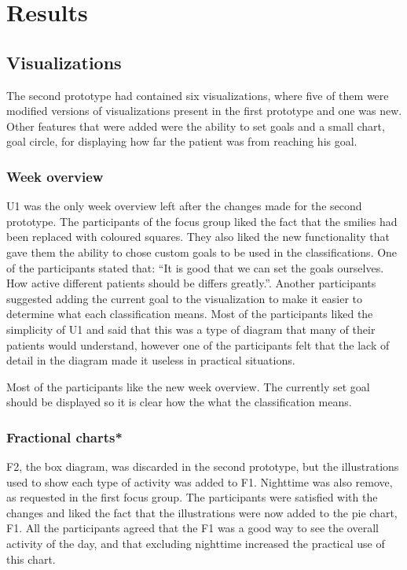 \section{Results}

\subsection{Visualizations}
The second prototype had contained six visualizations, where five of them were modified versions of visualizations present in the first prototype and one was new. Other features that were added were the ability to set goals and a small chart, goal circle, for displaying how far the patient was from reaching his goal.

\subsubsection{Week overview}
U1 was the only week overview left after the changes made for the second prototype. The participants of the focus group liked the fact that the smilies had been replaced with coloured squares. They also liked the new functionality that gave them the ability to chose custom goals to be used in the classifications. One of the participants stated that: ``It is good that we can set the goals ourselves. How active different patients should be differs greatly.''. Another participants suggested adding the current goal to the visualization to make it easier to determine what each classification means. Most of the participants liked the simplicity of U1 and said that this was a type of diagram that many of their patients would understand, however one of the participants felt that the lack of detail in the diagram made it useless in practical situations.

Most of the participants like the new week overview. The currently set goal should be displayed so it is clear how the what the classification means.

\subsubsection{Fractional charts*}
F2, the box diagram, was discarded in the second prototype, but the illustrations used to show each type of activity was added to F1. Nighttime was also remove, as requested in the first focus group. The participants were satisfied with the changes and liked the fact that the illustrations were now added to the pie chart, F1. All the participants agreed that the F1 was a good way to see the overall activity of the day, and that excluding nighttime increased the practical use of this chart.

